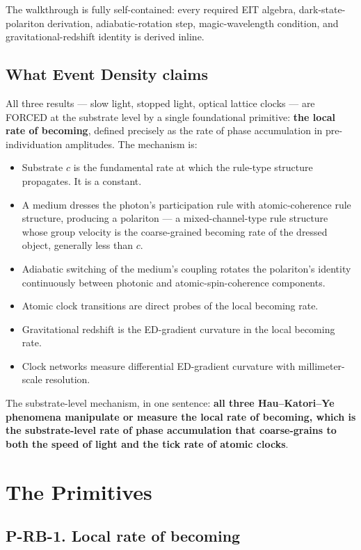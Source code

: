 \documentclass[11pt,a4paper]{article}
\begin{document}
The walkthrough is fully self-contained: every required EIT algebra, dark-state-polariton derivation, adiabatic-rotation step, magic-wavelength condition, and gravitational-redshift identity is derived inline.

\subsection*{What Event Density claims}

All three results --- slow light, stopped light, optical lattice clocks --- are FORCED at the substrate level by a single foundational primitive: \textbf{the local rate of becoming}, defined precisely as the rate of phase accumulation in pre-individuation amplitudes. The mechanism is:

\begin{itemize}[noitemsep]
  \item Substrate $c$ is the fundamental rate at which the rule-type structure propagates. It is a constant.
  \item A medium dresses the photon's participation rule with atomic-coherence rule structure, producing a polariton --- a mixed-channel-type rule structure whose group velocity is the coarse-grained becoming rate of the dressed object, generally less than $c$.
  \item Adiabatic switching of the medium's coupling rotates the polariton's identity continuously between photonic and atomic-spin-coherence components.
  \item Atomic clock transitions are direct probes of the local becoming rate.
  \item Gravitational redshift is the ED-gradient curvature in the local becoming rate.
  \item Clock networks measure differential ED-gradient curvature with millimeter-scale resolution.
\end{itemize}

The substrate-level mechanism, in one sentence: \textbf{all three Hau--Katori--Ye phenomena manipulate or measure the local rate of becoming, which is the substrate-level rate of phase accumulation that coarse-grains to both the speed of light and the tick rate of atomic clocks}.

\section{The Primitives}

\subsection{P-RB-1. Local rate of becoming}
\end{document}
